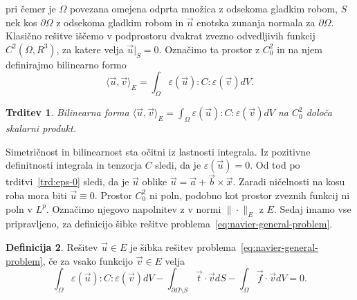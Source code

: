 \documentclass[a4paper,twoside]{article}
\theoremstyle{definition} %
\newtheorem{definicija}{Definicija}[section]
\theoremstyle{plain} %
\newtheorem{trditev}[definicija]{Trditev}
\numberwithin{equation}{section}
\newcommand{\eps}{\varepsilon}
\newcommand{\vv}{\vec{v}}
\newcommand{\vt}{\vec{t}}
\newcommand{\vu}{\vec{u}}
\newcommand{\va}{\vec{a}}
\newcommand{\vb}{\vec{b}}
\newcommand{\vn}{\vec{n}}
\newcommand{\vf}{\vec{f}}
\newcommand{\vx}{\vec{x}}
\begin{document}
pri čemer je $\Omega$ povezana omejena odprta množica z odsekoma gladkim robom,
$S$ nek kos $\partial\Omega$ z odsekoma gladkim robom in $\vn$
enotska zunanja normala za $\partial\Omega$.
Klasično rešitve iščemo v podprostoru dvakrat zvezno odvedljivih funkcij
$C^2(\Omega, R^3)$, za katere velja $\vu|_S = 0$. Označimo ta prostor z $C^2_0$
in na njem definirajmo bilinearno formo \[
  \langle \vu, \vv \rangle_E =  \int_{\Omega} \eps(\vu) : C : \eps(\vv) dV.
\]
\begin{trditev}
  Bilinearna forma $
  \langle \vu, \vv \rangle_E =  \int_{\Omega} \eps(\vu) : C : \eps(\vv) dV$ na
  $C^2_0$ določa skalarni produkt.
\end{trditev}
\proof
Simetričnost in bilinearnost sta očitni iz lastnosti integrala. Iz pozitivne
definitnosti integrala in tenzorja $C$ sledi, da je $\eps(\vu) = 0$. Od tod po
trditvi~\ref{trd:eps-0} sledi, da je $\vu$ oblike $\vu = \va + \vb \times \vx$.
Zaradi ničelnosti na kosu roba mora biti $\vu \equiv 0$.
\endproof
Prostor $C^2_0$ ni poln, podobno kot prostor zveznih funkcij ni poln v $L^p$.
Označimo njegovo napolnitev z v normi $\|\cdot\|_E$ z $E$. Sedaj imamo vse
pripravljeno, za definicijo šibke rešitve
problema~\ref{eq:navier-general-problem}.

\begin{definicija}
  \label{def:sibka}
  Rešitev $\vu \in E$ je šibka rešitev problema~\ref{eq:navier-general-problem},
  če za vsako funkcijo $\vv \in E$ velja \[
    \int_{\Omega}\eps(\vu) : C : \eps(\vv) dV - \int_{\partial \Omega\setminus S} \vt\cdot \vv dS -
\int_{\Omega} \vf\cdot \vv dV = 0. \]
\end{definicija}
\end{document}
